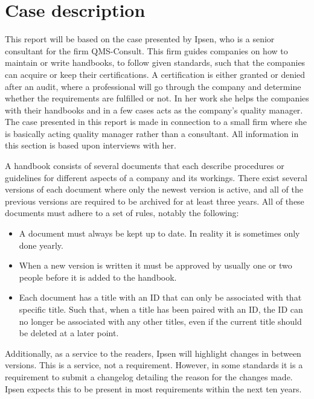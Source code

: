 \section{Case description} \label{sec:CaseDescription}

This report will be based on the case presented by Ipsen, who is a senior consultant for the firm QMS-Consult.
This firm guides companies on how to maintain or write handbooks, to follow given standards, such that the companies can acquire or keep their certifications.
A certification is either granted or denied after an audit, where a professional will go through the company and determine whether the requirements are fulfilled or not.
In her work she helps the companies with their handbooks and in a few cases acts as the company's quality manager.
The case presented in this report is made in connection to a small firm where she is basically acting quality manager rather than a consultant.
All information in this section is based upon interviews with her.

A handbook consists of several documents that each describe procedures or guidelines for different aspects of a company and its workings.
There exist several versions of each document where only the newest version is active, and all of the previous versions are required to be archived for at least three years.
All of these documents must adhere to a set of rules, notably the following:

\begin{itemize}
	\item
	A document must always be kept up to date.
	In reality it is sometimes only done yearly.
	\item
	When a new version is written it must be approved by usually one or two people before it is added to the handbook.
	\item
	Each document has a title with an ID that can only be associated with that specific title.
	Such that, when a title has been paired with an ID, the ID can no longer be associated with any other titles, even if the current title should be deleted at a later point.
\end{itemize}

Additionally, as a service to the readers, Ipsen will highlight changes in between versions.
This is a service, not a requirement.
However, in some standards it is a requirement to submit a changelog detailing the reason for the changes made.
Ipsen expects this to be present in most requirements within the next ten years.

